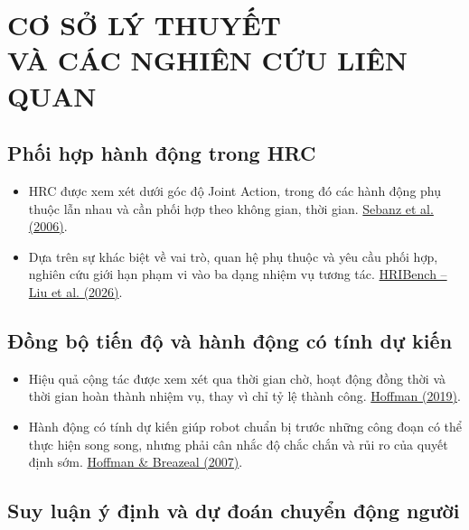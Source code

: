 \chapter[CƠ SỞ LÝ THUYẾT VÀ CÁC NGHIÊN CỨU LIÊN QUAN]{CƠ SỞ LÝ THUYẾT\\VÀ CÁC NGHIÊN CỨU LIÊN QUAN}
\label{chap:background}

\section{Phối hợp hành động trong HRC}

\begin{itemize}
    \item HRC được xem xét dưới góc độ Joint Action, trong đó các hành động phụ thuộc lẫn nhau và cần phối hợp theo không gian, thời gian.
    \href{https://doi.org/10.1016/j.tics.2005.12.009}{Sebanz et al. (2006)}.

    \item Dựa trên sự khác biệt về vai trò, quan hệ phụ thuộc và yêu cầu phối hợp, nghiên cứu giới hạn phạm vi vào ba dạng nhiệm vụ tương tác.
    \href{https://arxiv.org/abs/2607.13056}{HRIBench -- Liu et al. (2026)}.
\end{itemize}


\section{Đồng bộ tiến độ và hành động có tính dự kiến}

\begin{itemize}
    \item Hiệu quả cộng tác được xem xét qua thời gian chờ, hoạt động đồng thời và thời gian hoàn thành nhiệm vụ, thay vì chỉ tỷ lệ thành công.
    \href{https://doi.org/10.1109/THMS.2019.2904558}{Hoffman (2019)}.

    \item Hành động có tính dự kiến giúp robot chuẩn bị trước những công đoạn có thể thực hiện song song, nhưng phải cân nhắc độ chắc chắn và rủi ro của quyết định sớm.
    \href{https://doi.org/10.1145/1228716.1228718}{Hoffman \& Breazeal (2007)}.
\end{itemize}


\section{Suy luận ý định và dự đoán chuyển động người}

